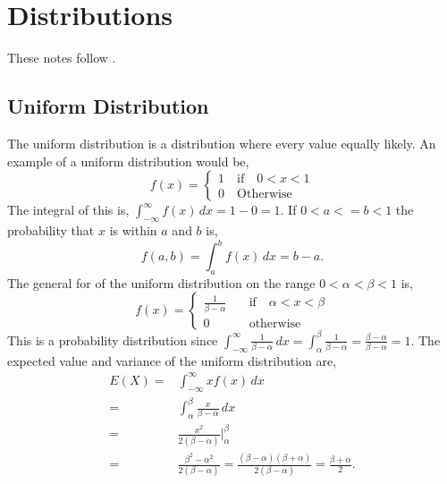 \documentclass{article}
\begin{document}
\section{Distributions}

These notes follow \cite{ross98}.

\subsection{Uniform Distribution}

The uniform distribution is a distribution where every value equally likely. An example of a uniform distribution would be,
\begin{equation}
    f(x) =
    \begin{cases}
        1 \quad \text{if} \quad 0 < x < 1 \\
        0 \quad \text{Otherwise}
    \end{cases}
\end{equation}
The integral of this is, $\int_{-\infty}^{\infty} f(x) \, dx = 1 - 0 = 1$. If $0 < a <= b < 1$ the probability that $x$ is within $a$ and $b$ is,
\begin{equation*}
    f(a, b) = \int_{a}^{b} f(x) \, dx = b - a.
\end{equation*}
The general for of the uniform distribution on the range $0 < \alpha < \beta < 1$ is,
\begin{equation}
    f(x) =
    \begin{cases}
        \frac{1}{\beta - \alpha} \quad & \text{if} \quad \alpha < x < \beta \\
        0 \quad & \text{otherwise}
    \end{cases}
\end{equation}
This is a probability distribution since $\int_{-\infty}^{\infty} \frac{1}{\beta - \alpha} \, dx = \int_{\alpha}^{\beta} \frac{1}{\beta - \alpha} = \frac{\beta - \alpha}{\beta - \alpha} = 1$. The expected value and variance of the uniform distribution are,
\begin{align*}
    E(X) = & \int_{-\infty}^{\infty} x f(x) \, dx \\
         = & \int_{\alpha}^{\beta} \frac{x}{\beta - \alpha} \, dx \\
         = & \frac{x^2}{2(\beta - \alpha)} \Bigr|^{\beta}_{\alpha} \\
         = & \frac{\beta^2 - \alpha^2}{2(\beta - \alpha)} = \frac{(\beta - \alpha)(\beta + \alpha)}{2(\beta - \alpha)} = \frac{\beta + \alpha}{2}.
\end{align*}
\end{document}
